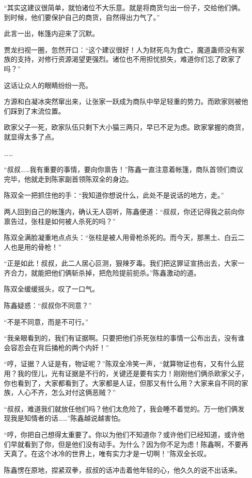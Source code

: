 \begin{this_body}
“其实这建议很简单，就怕诸位不大乐意。就是将商货匀出一份子，交给他们俩。到时候，他们要保护自己的商货，自然得出力气了。”

此言一出，帐篷内迎来了沉默。

贾龙扫视一圈，忽然开口：“这个建议很好！人为财死鸟为食亡，魔道蛊师没有家族的支持，对修行资源渴望更强烈。诸位也不用担忧损失，难道你们忘了欧家了吗？”

这话让众人的眼睛纷纷一亮。

方源和白凝冰突然窜出来，让张家一跃成为商队中举足轻重的势力。而欧家则被他们踩到了末流位置。

欧家父子一死，欧家队伍只剩下大小猫三两只，早已不足为虑。欧家掌握的商货，就显得太多了点。

……

“叔叔……我有重要的事情，要向你禀告！”陈鑫一直注意着帐篷，商队首领们商议完毕，他就走到陈家副首领陈双全的身边。

陈双全一把抓住他的手：“我知道你想说什么，此处不是说话的地方，走。”

两人回到自己的帐篷内，确认无人窃听，陈鑫便道：“叔叔，你还记得我之前向你禀告过，张柱是如何被人杀死的吗？”

陈双全满脸凝重地点点头：“张柱是被人用骨枪杀死的。而今天，那黑土、白云二人也是用的骨枪！”

“正是如此！叔叔，此二人居心叵测，狠辣歹毒。我们把这罪证宣扬出去，大家一齐合力，就能把他们俩斩杀掉，把危险提前扼杀。”陈鑫激动的道。

陈双全缓缓摇头，叹了一口气。

陈鑫疑惑：“叔叔你不同意？”

“不是不同意，而是不可行。”

“我亲眼看到的，我们有证据啊。只要把他们杀死张柱的事情一公布出去，没有谁会容忍会在背后捅枪的两个内奸！”

“哼，证据？人证是有，物证呢？”陈双全冷笑一声，“就算物证也有，又有什么屁用？我的侄儿，光有证据是不行的，关键还是要有实力！刚刚他们俩杀欧家父子，你也看到了，大家都看到了。大家都是人证，但那又有什么用？大家来自不同的家族，人心不齐，怎么对付这俩恶贼？”

“叔叔，难道我们就放任他们吗？他们太危险了，我会睡不着觉的。万一他们俩发现我是知情者的话……”陈鑫越说越害怕。

“哼，你把自己想得太重要了。你以为他们不知道你？或许他们已经知道，或许他们早就看到了你，但是他们没有动手。为什么？因为你不足为虑！陈鑫啊，不要再天真了。在这个冰冷的世界上，唯有实力才是一切啊！”陈双全长叹。

陈鑫愣在原地，捏紧双拳，叔叔的话冲击着他年轻的心，他久久的说不出话来。

\end{this_body}

